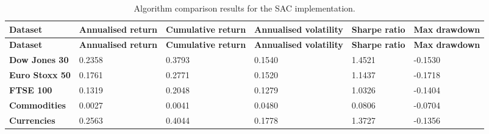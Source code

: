 \begin{longtable}{|l|p{2.1cm}|p{2.1cm}|p{2.1cm}|p{1.5cm}|p{2cm}|}
    \caption{Algorithm comparison results for the SAC implementation.}
    \label{tab:experiment_algorithms_sac}
    \\ 
    \hline
    \textbf{Dataset} & \textbf{Annualised return} & \textbf{Cumulative return} & \textbf{Annualised volatility} & \textbf{Sharpe ratio} & \textbf{Max drawdown}  \\ \midrule
    \endfirsthead

    \hline
    \textbf{Dataset} & \textbf{Annualised return} & \textbf{Cumulative return} & \textbf{Annualised volatility} & \textbf{Sharpe ratio} & \textbf{Max drawdown}  \\ \midrule
    \endhead

    \endfoot
    \hline

    \textbf{Dow Jones 30} & 0.2358 & 0.3793 & 0.1540 & 1.4521 & -0.1530 \\ \hline
    \textbf{Euro Stoxx 50} & 0.1761 & 0.2771 & 0.1520 & 1.1437 & -0.1718 \\ \hline
    \textbf{FTSE 100} & 0.1319 & 0.2048 & 0.1279 & 1.0326 & -0.1404 \\ \hline
    \textbf{Commodities} & 0.0027 & 0.0041 & 0.0480 & 0.0806 & -0.0704 \\ \hline
    \textbf{Currencies} & 0.2563 & 0.4044 & 0.1778 & 1.3727 & -0.1356 \\ \hline
\end{longtable}